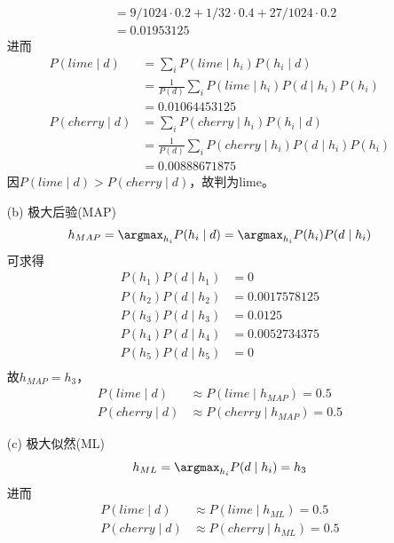 \documentclass[a4paper, 11pt]{article}
\begin{document}
\begin{answer}
\begin{itemize}
\[\begin{aligned}
        &=9/1024\cdot 0.2 + 1/32\cdot 0.4 + 27/1024\cdot 0.2\\
        &=0.01953125
    \end{aligned}\]
    进而
    \[\begin{aligned}
        P(lime \mid d)&=\sum_{i}P(lime\mid h_i)P(h_i\mid d)\\
        &=\frac{1}{P(d)}\sum_iP(lime\mid h_i)P(d\mid h_i)P(h_i)\\
        &=0.01064453125\\
        P(cherry \mid d)&=\sum_{i}P(cherry\mid h_i)P(h_i\mid d)\\
        &=\frac{1}{P(d)}\sum_iP(cherry\mid h_i)P(d\mid h_i)P(h_i)\\
        &=0.00888671875
    \end{aligned}\]
    因$P(lime \mid d)>P(cherry \mid d)$，故判为lime。
    \item [(b)] 极大后验(MAP)
    \[h_{MAP}=\argmax_{h_i} P(h_i\mid d)=\argmax_{h_i} P(h_i)P(d\mid h_i)\]
    可求得
    \[\begin{aligned}
        P(h_1)P(d\mid h_1) &= 0\\
        P(h_2)P(d\mid h_2) &= 0.0017578125\\
        P(h_3)P(d\mid h_3) &= 0.0125\\
        P(h_4)P(d\mid h_4) &= 0.0052734375\\
        P(h_5)P(d\mid h_5) &= 0\\
    \end{aligned}\]
    故$h_{MAP}=h_3$，
    \[\begin{aligned}
        P(lime\mid d)&\approx P(lime\mid h_{MAP})=0.5\\
        P(cherry\mid d)&\approx P(cherry\mid h_{MAP})=0.5
    \end{aligned}\]
    \item [(c)] 极大似然(ML)
    \[h_{ML}=\argmax_{h_i} P(d\mid h_i)=h_3\]
    进而
    \[\begin{aligned}
        P(lime\mid d)&\approx P(lime\mid h_{ML})=0.5\\
        P(cherry\mid d)&\approx P(cherry\mid h_{ML})=0.5
    \end{aligned}\]
\end{itemize}
\end{answer}
\end{document}
